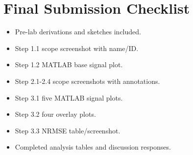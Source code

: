 \documentclass[11pt,letterpaper]{article}
\begin{document}
\section*{Final Submission Checklist}
\begin{itemize}
    \item[\(\square\)] Pre-lab derivations and sketches included.
    \item[\(\square\)] Step 1.1 scope screenshot with name/ID.
    \item[\(\square\)] Step 1.2 MATLAB base signal plot.
    \item[\(\square\)] Step 2.1-2.4 scope screenshots with annotations.
    \item[\(\square\)] Step 3.1 five MATLAB signal plots.
    \item[\(\square\)] Step 3.2 four overlay plots.
    \item[\(\square\)] Step 3.3 NRMSE table/screenshot.
    \item[\(\square\)] Completed analysis tables and discussion responses.
\end{itemize}
\end{document}
